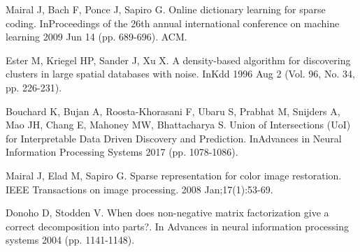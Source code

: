 \documentclass[conference]{IEEEtran}
\begin{document}
\begin{thebibliography}{00}
 Mairal J, Bach F, Ponce J, Sapiro G. Online dictionary learning for sparse coding. InProceedings of the 26th annual international conference on machine learning 2009 Jun 14 (pp. 689-696). ACM.

 Ester M, Kriegel HP, Sander J, Xu X. A density-based algorithm for discovering clusters in large spatial databases with noise. InKdd 1996 Aug 2 (Vol. 96, No. 34, pp. 226-231).

 Bouchard K, Bujan A, Roosta-Khorasani F, Ubaru S, Prabhat M, Snijders A, Mao JH, Chang E, Mahoney MW, Bhattacharya S. Union of Intersections (UoI) for Interpretable Data Driven Discovery and Prediction. InAdvances in Neural Information Processing Systems 2017 (pp. 1078-1086).

 Mairal J, Elad M, Sapiro G. Sparse representation for color image restoration. IEEE Transactions on image processing. 2008 Jan;17(1):53-69.

 Donoho D, Stodden V. When does non-negative matrix factorization give a correct decomposition into parts?. In Advances in neural information processing systems 2004 (pp. 1141-1148).

\end{thebibliography}
\vspace{12pt}
\end{document}
